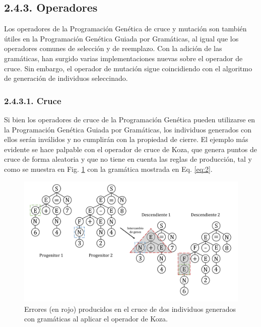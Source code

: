\documentclass[spanish,a4paper,12pt,twoside]{report}
\begin{document}
    \subsection*{\large 2.4.3. Operadores}
    Los operadores de la Programación Genética de cruce y mutación son también útiles en la Programación Genética Guiada por Gramáticas, al igual que los operadores comunes de selección y de reemplazo. Con la adición de las gramáticas, han surgido varias implementaciones nuevas sobre el operador de cruce. Sin embargo, el operador de mutación sigue coincidiendo con el algoritmo de generación de individuos seleccinado.
    
      \subsubsection*{\normalsize 2.4.3.1. Cruce}
      Si bien los operadores de cruce de la Programación Genética pueden utilizarse en la Programación Genética Guiada por Gramáticas, los individuos generados con ellos serán inválidos y no cumplirán con la propiedad de cierre. El ejemplo más evidente se hace palpable con el operador de cruce de Koza, que genera puntos de cruce de forma aleatoria y que no tiene en cuenta las reglas de producción, tal y como se muestra en Fig. \ref{fig:7} con la gramática mostrada en Eq. \ref{eq:2}. \par
      \begin{figure}[H]
        \centering
        \includegraphics[width = 1\textwidth]{resources/Fig7.pdf}
        \caption{Errores (en rojo) producidos en el cruce de dos individuos generados con gramáticas al aplicar el operador de Koza.}
        \label{fig:7}
      \end{figure} \par
      
\end{document}
